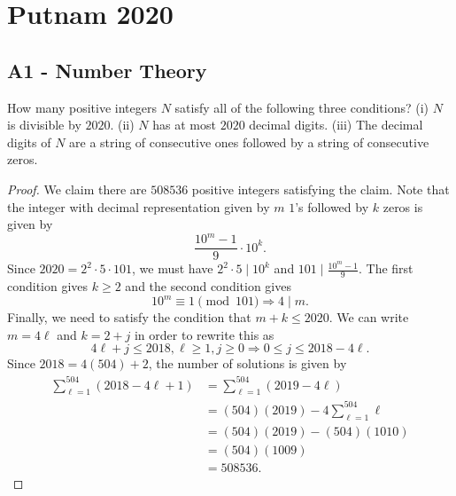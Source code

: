 \documentclass[11pt]{scrartcl}
\newcommand{\<}{\langle}
\renewcommand{\>}{\rangle}
\begin{document}
\pagebreak
\section{Putnam 2020}
\subsection{A1 - Number Theory}
How many positive integers $N$ satisfy all of the following three conditions?
(i) $N$ is divisible by $2020$.
(ii) $N$ has at most $2020$ decimal digits.
(iii) The decimal digits of $N$ are a string of consecutive ones followed by a string of consecutive zeros.
\begin{proof}
We claim there are $508536$ positive integers satisfying the claim.  Note that the integer with decimal representation given by $m$ $1$'s followed by $k$ zeros is given by 
$$\frac{10^m - 1}{9} \cdot 10^k.$$
Since $2020 = 2^2 \cdot 5 \cdot 101$, we must have $2^2 \cdot 5 \mid 10^k$ and $101 \mid \frac{10^m - 1}{9}.$  The first condition gives $k \ge 2$ and the second condition gives 
$$10^m \equiv 1 \pmod{101} \Rightarrow 4 \mid m.$$
Finally, we need to satisfy the condition that $m + k \le 2020$.  We can write $m = 4 \ell$ and $k = 2 + j$ in order to rewrite this as 
$$4\ell + j \le 2018, \ell \ge 1, j \ge 0 \Rightarrow 0 \le j \le 2018 - 4\ell.$$
Since $2018 = 4(504) + 2$, the number of solutions is given by 
\begin{align*}
\sum_{\ell = 1}^{504} (2018 - 4\ell + 1) &= \sum_{\ell = 1}^{504} (2019 - 4\ell) \\
&= (504)(2019) - 4 \sum_{\ell=1}^{504} \ell \\
&= (504)(2019) - (504)(1010) \\
&= (504)(1009) \\
&= 508536.
\end{align*}


\end{proof}


\pagebreak
\end{document}
